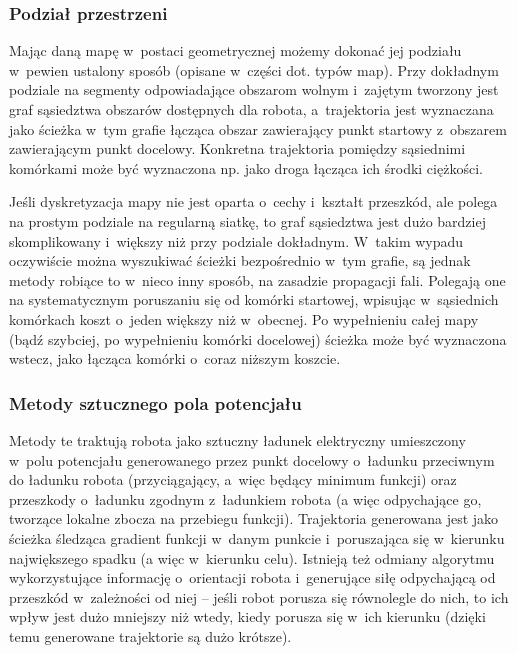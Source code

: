 \subsubsection{Podział przestrzeni}

Mając daną mapę w~postaci geometrycznej możemy dokonać jej podziału w~pewien ustalony
sposób (opisane w~części dot. typów map). Przy dokładnym podziale na segmenty
odpowiadające obszarom wolnym i~zajętym tworzony jest graf sąsiedztwa obszarów dostępnych
dla robota, a~trajektoria jest wyznaczana jako ścieżka w~tym grafie łącząca obszar
zawierający punkt startowy z~obszarem zawierającym punkt docelowy. Konkretna trajektoria
pomiędzy sąsiednimi komórkami może być wyznaczona np. jako droga łącząca ich środki ciężkości.

Jeśli dyskretyzacja mapy nie jest oparta o~cechy i~kształt przeszkód, ale polega na
prostym podziale na regularną siatkę, to graf sąsiedztwa jest dużo bardziej skomplikowany
i~większy niż przy podziale dokładnym. W~takim wypadu oczywiście można wyszukiwać
ścieżki bezpośrednio w~tym grafie, są jednak metody robiące to w~nieco inny sposób, 
na zasadzie propagacji fali. Polegają one na systematycznym poruszaniu się
od komórki startowej, wpisując w~sąsiednich komórkach koszt o~jeden większy niż w~obecnej.
Po wypełnieniu całej mapy (bądź szybciej, po wypełnieniu komórki docelowej) ścieżka
może być wyznaczona wstecz, jako łącząca komórki o~coraz niższym koszcie.

\subsubsection{Metody sztucznego pola potencjału}

Metody te traktują robota jako sztuczny ładunek elektryczny umieszczony w~polu potencjału
generowanego przez punkt docelowy o~ładunku przeciwnym do ładunku robota
(przyciągający, a~więc będący minimum funkcji) oraz przeszkody o~ładunku zgodnym
z~ładunkiem robota (a więc odpychające go, tworzące lokalne zbocza na przebiegu funkcji).
Trajektoria generowana jest jako ścieżka śledząca gradient funkcji w~danym punkcie
i~poruszająca się w~kierunku największego spadku (a więc w~kierunku celu). Istnieją
też odmiany algorytmu wykorzystujące informację o~orientacji robota i~generujące
siłę odpychającą od przeszkód w~zależności od niej -- jeśli robot porusza się równolegle
do nich, to ich wpływ jest dużo mniejszy niż wtedy, kiedy porusza się w~ich kierunku
(dzięki temu generowane trajektorie są dużo krótsze).

